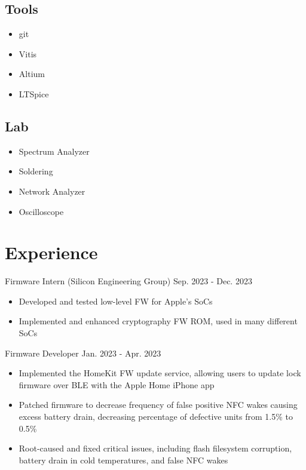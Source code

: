 \documentclass[lighthipster]{styles}
\begin{document}
\begin{paracol}{2}
{\subsection*{Tools}
\vspace{-0.4cm}
\begin{multicols}{2}
    \begin{itemize}
        \item git
        \item Vitis
        \item Altium
        \item LTSpice
    \end{itemize}
\end{multicols}

\subsection*{Lab}
\vspace{-0.4cm}
\begin{multicols}{2}[]
    \begin{itemize}
        \item Spectrum Analyzer
        \item Soldering
        \item Network Analyzer
        \item Oscilloscope
    \end{itemize}
\end{multicols}

}
\switchcolumn

\section*{Experience}

{Firmware Intern (Silicon Engineering Group)}
{Sep. 2023 - Dec. 2023}
\begin{itemize}
    \item Developed and tested low-level FW for Apple's SoCs
    \item Implemented and enhanced cryptography FW ROM, used in many different SoCs
\end{itemize}

{Firmware Developer}
{Jan. 2023 - Apr. 2023}
\begin{itemize}
    \item Implemented the HomeKit FW update service, allowing users to update lock
          firmware over BLE with the Apple Home iPhone app
    \item Patched firmware to decrease frequency of false positive NFC wakes
          causing excess battery drain, decreasing percentage of defective
          units from 1.5\% to 0.5\%
    \item Root-caused and fixed critical issues, including flash filesystem
          corruption, battery drain in cold temperatures, and false NFC wakes
\end{itemize}


\end{paracol}
\end{document}
